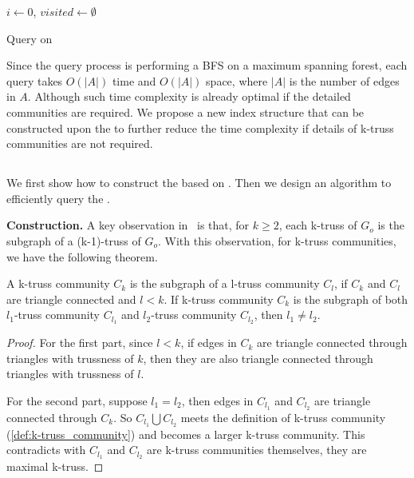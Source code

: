 \begin{algorithm}
	\BlankLine
	$i \gets 0$, $visited \gets \emptyset$\;
	\caption{Query on \inducedgraph{}}\label{alg:\inducedgraph{}_query}
\end{algorithm}

Since the query process is performing a BFS on a maximum spanning forest, each query takes $O(|A|)$ time and $O(|A|)$ space, where $|A|$ is the number of edges in $A$. Although such time complexity is already optimal if the detailed communities are required. We propose a new index structure that can be constructed upon the \inducedgraph{} to further reduce the time complexity if details of k-truss communities are not required.

\subsection{\TreeIndex{}}

We first show how to construct the \treeindex{} based on \inducedgraph{}. Then we design an algorithm to efficiently query the \treeindex{}. 

\vskip 0.1in \noindent \textbf{\TreeIndex{} Construction.} A key observation in~\cite{cohen2008trusses} is that, for $k \ge 2$, each k-truss of $G_o$ is the subgraph of a (k-1)-truss of $G_o$. With this observation, for k-truss communities, we have the following theorem.

\begin{Thm}
A k-truss community $C_k$ is the subgraph of a l-truss community $C_l$, if $C_k$ and $C_l$ are triangle connected and $l < k$. If k-truss community $C_k$ is the subgraph of both $l_1$-truss community $C_{l_1}$ and $l_2$-truss community $C_{l_2}$, then $l_1 \neq l_2$.
\label{thm:truss_hierarchy}
\end{Thm}

\begin{proof}
For the first part, since $l < k$, if edges in $C_k$ are triangle connected through triangles with trussness of $k$, then they are also triangle connected through triangles with trussness of $l$. 

For the second part, suppose $l_1 = l_2$, then edges in $C_{l_1}$ and $C_{l_2}$ are triangle connected through $C_k$. So $C_{l_1} \bigcup C_{l_2}$ meets the definition of k-truss community (\autoref{def:k-truss_community}) and becomes a larger k-truss community. This contradicts with $C_{l_1}$ and $C_{l_2}$ are k-truss communities themselves, \ie they are maximal k-truss.
\end{proof}

